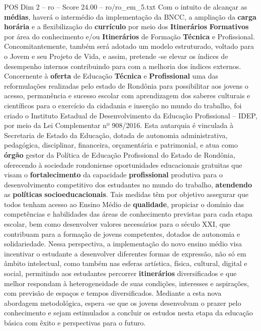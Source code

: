 \begin{textsample}{POS Dim 2 – ro – Score 24.00 – ro/ro\_em\_5.txt}
Com o intuito de alcançar as \textbf{médias}, haverá o intermédio da implementação da BNCC, a ampliação da \textbf{carga} \textbf{horária} e a flexibilização do \textbf{currículo} por meio dos \textbf{Itinerários} \textbf{Formativos} por área do conhecimento e/ou \textbf{Itinerários} de Formação \textbf{Técnica} e Profissional.
Concomitantemente, também será adotado um modelo estruturado, voltado para o Jovem e seu Projeto de Vida, e assim, pretende -se elevar os índices de desempenho internos contribuindo para com a melhoria dos índices externos.
Concernente à \textbf{oferta} de Educação \textbf{Técnica} e \textbf{Profissional} uma das reformulações realizadas pelo estado de Rondônia para possibilitar aos jovens o acesso, permanência e sucesso escolar com aprendizagem dos saberes culturais e científicos para o exercício da cidadania e inserção no mundo do trabalho, foi criado o Instituto Estadual de Desenvolvimento da Educação Profissional – IDEP, por meio da Lei Complementar nº 908/2016.
Esta autarquia é vinculada à Secretaria de Estado da Educação, dotada de autonomia administrativa, pedagógica, disciplinar, financeira, orçamentária e patrimonial, e atua como \textbf{órgão} gestor da Política de Educação Profissional do Estado de Rondônia, oferecendo à sociedade rondoniense oportunidades educacionais gratuitas que visam o \textbf{fortalecimento} da capacidade \textbf{profissional} produtiva para o desenvolvimento competitivo dos estudantes no mundo do trabalho, \textbf{atendendo} as \textbf{políticas} \textbf{socioeducacionais}.
Tais medidas têm por objetivo assegurar que todos tenham acesso ao Ensino Médio de \textbf{qualidade}, propiciar o domínio das competências e habilidades das áreas de conhecimento previstas para cada etapa escolar, bem como desenvolver valores necessários para o século XXI, que contribuam para a formação de jovens competentes, dotados de autonomia e solidariedade.
Nessa perspectiva, a implementação do novo ensino médio visa incentivar o estudante a desenvolver diferentes formas de expressão, não só em âmbito intelectual, como também nas esferas artística, física, cultural, digital e social, permitindo aos estudantes percorrer \textbf{itinerários} diversificados e que melhor respondam à heterogeneidade de suas condições, interesses e aspirações, com previsão de espaços e tempos diversificados.
Mediante a esta nova abordagem metodológica, espera -se que os jovens desenvolvam o prazer pelo conhecimento e sejam estimulados a concluir os estudos nesta etapa da educação básica com êxito e perspectivas para o futuro.

\end{textsample}

